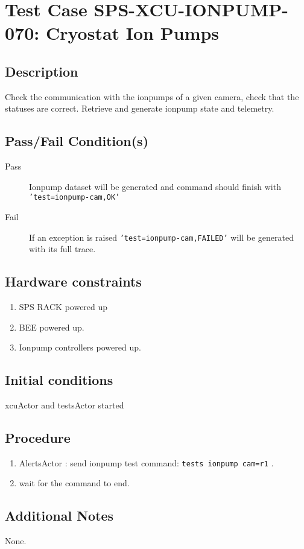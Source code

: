 \section{Test Case SPS-XCU-IONPUMP-070: Cryostat Ion Pumps}

\subsection{Description}

Check the communication with the ionpumps of a given camera, check that the statuses are correct.
Retrieve and generate ionpump state and telemetry.

\subsection{Pass/Fail Condition(s)}

\begin{description}
\item [Pass] Ionpump dataset will be generated and command should finish with \texttt{'test=ionpump-cam,OK'}
\item [Fail] If an exception is raised \texttt{'test=ionpump-cam,FAILED'} will be generated with its full trace.

\end{description}

\subsection{Hardware constraints}

\begin{enumerate}
    \item SPS RACK powered up
    \item BEE powered up.
    \item Ionpump controllers powered up.
\end{enumerate}

\subsection{Initial conditions}

xcuActor and testsActor started

\subsection{Procedure}

\begin{enumerate}
    \item AlertsActor : send ionpump test command: \texttt{tests ionpump cam=r1} .
    \item wait for the command to end.
\end{enumerate}

\subsection{Additional Notes}
None.
